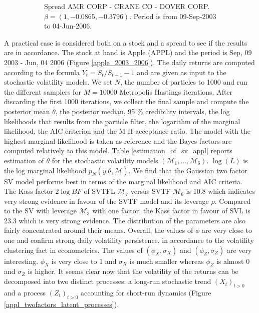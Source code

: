 \documentclass[11pt,a4,twosided,singlespacing,titlepagenumber=on]{scrreprt}
\numberwithin{equation}{chapter} %
\theoremstyle{remark}
\begin{document}
\begin{figure}[H]
\begin{subfigure}[t]{0.49\textwidth}
        \caption{Spread AMR CORP - CRANE CO - DOVER CORP. $\beta = (1, -0.0865, -0.3796)$. Period is from 09-Sep-2003 to 04-Jun-2006.}
        \label{spread_amr_crane_2003_2006}
    \end{subfigure}
    \caption{}
\end{figure}

A practical case is considered both on a stock and a spread to see if the results are in accordance. The stock at hand is Apple (APPL) and the period is Sep, 09 2003 - Jun, 04 2006 (Figure \ref{apple_2003_2006}). The daily returns are computed according to the formula $Y_t = S_t / S_{t-1} - 1$ and are given as input to the stochastic volatility models. We set $N$, the number of particles to 1000 and run the different samplers for $M = 10000$ Metropolis Hastings iterations. After discarding the first 1000 iterations, we collect the final sample and compute the posterior mean $\bar{\theta}$, the posterior median, 95 \% credibility intervals, the log likelihoods that results from the particle filter, the logarithm of the marginal likelihood, the AIC criterion and the M-H acceptance ratio. The model with the highest marginal likelihood is taken as reference and the Bayes factors are computed relatively to this model. Table \ref{estimation_of_sv_appl} reports estimation of $\theta$ for the stochastic volatility models $(\mathcal{M}_1, ..., \mathcal{M}_6)$. $\log (L)$ is the log marginal likelihood $p_N(y|\bar{\theta}, \mathcal{M})$. We find that the Gaussian two factor SV model performs best in terms of the marginal likelihood and AIC criteria. The Kass factor $2 \log BF$ of SVTFL $\mathcal{M}_7$ versus SVTF $\mathcal{M}_6$ is 10.8 which indicates very strong evidence in favour of the SVTF model and its leverage $\rho$. Compared to the SV with leverage $\mathcal{M}_3$ with one factor, the Kass factor in favour of SVL is 23.3 which is very strong evidence. The distribution of the parameters are also fairly concentrated around their means. Overall, the values of $\phi$ are very close to one and confirm strong daily volatility persistence, in accordance to the volatility clustering fact in econometrics. The values of $(\phi_X, \sigma_X)$ and $(\phi_Z, \sigma_Z)$ are very interesting. $\phi_X$ is very close to 1 and $\sigma_X$ is much smaller whereas $\phi_Z$ is almost 0 and $\sigma_Z$ is higher. It seems clear now that the volatility of the returns can be decomposed into two distinct processes: a long-run stochastic trend $(X_t)_{t>0}$ and a process $(Z_t)_{t>0}$ accounting for short-run dynamics (Figure \ref{appl_twofactors_latent_processes}).
\end{document}
